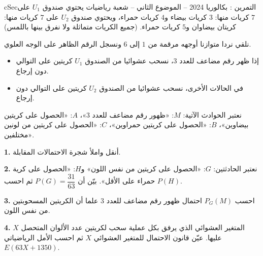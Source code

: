 \documentclass[12pt,a4paper]{article}
\newenvironment{BOX}[2]{\begin{otherlanguage}{english}\begin{arbox}{#1}{#2}}{\end{arbox}\end{otherlanguage}}
\newcounter{exo}
\newenvironment{tamrin}[1]{\stepcounter{exo}\begin{BOX}{cSec}{التمرين \theexo: #1}}{\end{BOX}}
\newenvironment{LTR}{\begin{otherlanguage}{english}}{\end{otherlanguage}}
\renewcommand{\ldots}{\mathinner{\ldotp\ldotp\ldotp}}
\newcommand{\QQ}[1]{\par\smallskip\textbf{#1.} }
\begin{document}
\begin{tamrin}{بكالوريا 2024 -- الموضوع الثاني -- شعبة رياضيات}
يحتوي صندوق $U_1$ على $7$ كريات منها: $3$ كريات بيضاء و$4$ كريات حمراء، ويحتوي صندوق $U_2$ على $7$ كريات منها: كريتان بيضاوان و$5$ كريات حمراء. (جميع الكريات متماثلة ولا نفرق بينها باللمس)

نلقي نردا متوازنا أوجهه مرقمة من $1$ إلى $6$ ونسجل الرقم الظاهر على الوجه العلوي.
\begin{itemize}
\item إذا ظهر رقم مضاعف للعدد $3$، نسحب عشوائيا من الصندوق $U_1$ كريتين على التوالي دون إرجاع.
\item في الحالات الأخرى، نسحب عشوائيا من الصندوق $U_2$ كريتين على التوالي دون إرجاع.
\end{itemize}
نعتبر الحوادث الآتية: $M$: «ظهور رقم مضاعف للعدد $3$»، $A$: «الحصول على كريتين بيضاوين»،
$B$: «الحصول على كريتين حمراوين»، $C$: «الحصول على كريتين من لونين مختلفين».
\begin{center}\begin{LTR}\end{LTR}\end{center}
\QQ{1} أنقل واملأ شجرة الاحتمالات المقابلة.
\QQ{2} نعتبر الحادثتين: $G$: «الحصول على كريتين من نفس اللون» و$H$: «الحصول على كرية حمراء على الأقل».
بيّن أن $P(G)=\dfrac{31}{63}$ ثم احسب $P(H)$.
\QQ{3} احسب $P_G(M)$ احتمال ظهور رقم مضاعف للعدد $3$ علما أن الكريتين المسحوبتين من نفس اللون.
\QQ{4} $X$ المتغير العشوائي الذي يرفق بكل عملية سحب لكريتين عدد الألوان المتحصل عليها.
عيّن قانون الاحتمال للمتغير العشوائي $X$ ثم احسب الأمل الرياضياتي $E(63X+1350)$.
\end{tamrin}
\end{document}
